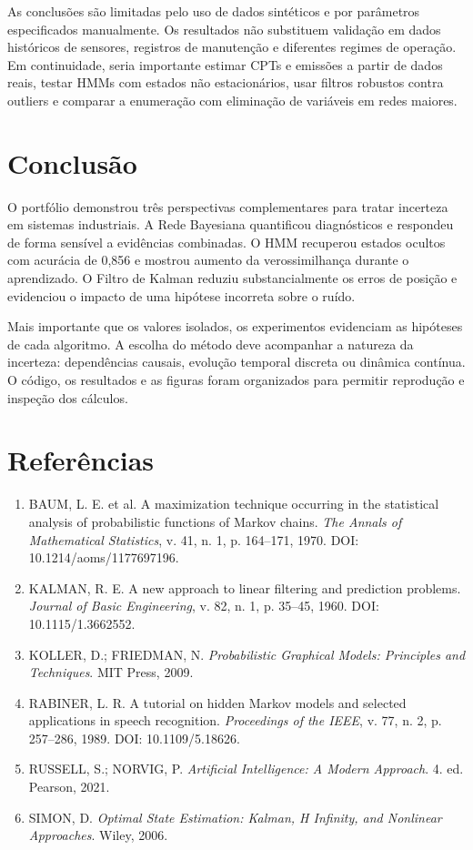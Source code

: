 \documentclass[11pt,a4paper]{article}
\begin{document}
As conclusões são limitadas pelo uso de dados sintéticos e por parâmetros especificados manualmente. Os resultados não substituem validação em dados históricos de sensores, registros de manutenção e diferentes regimes de operação. Em continuidade, seria importante estimar CPTs e emissões a partir de dados reais, testar HMMs com estados não estacionários, usar filtros robustos contra outliers e comparar a enumeração com eliminação de variáveis em redes maiores.

\section{Conclusão}
O portfólio demonstrou três perspectivas complementares para tratar incerteza em sistemas industriais. A Rede Bayesiana quantificou diagnósticos e respondeu de forma sensível a evidências combinadas. O HMM recuperou estados ocultos com acurácia de 0,856 e mostrou aumento da verossimilhança durante o aprendizado. O Filtro de Kalman reduziu substancialmente os erros de posição e evidenciou o impacto de uma hipótese incorreta sobre o ruído.

Mais importante que os valores isolados, os experimentos evidenciam as hipóteses de cada algoritmo. A escolha do método deve acompanhar a natureza da incerteza: dependências causais, evolução temporal discreta ou dinâmica contínua. O código, os resultados e as figuras foram organizados para permitir reprodução e inspeção dos cálculos.

\section*{Referências}
\begin{enumerate}
\item BAUM, L. E. et al. A maximization technique occurring in the statistical analysis of probabilistic functions of Markov chains. \textit{The Annals of Mathematical Statistics}, v. 41, n. 1, p. 164--171, 1970. DOI: 10.1214/aoms/1177697196.
\item KALMAN, R. E. A new approach to linear filtering and prediction problems. \textit{Journal of Basic Engineering}, v. 82, n. 1, p. 35--45, 1960. DOI: 10.1115/1.3662552.
\item KOLLER, D.; FRIEDMAN, N. \textit{Probabilistic Graphical Models: Principles and Techniques}. MIT Press, 2009.
\item RABINER, L. R. A tutorial on hidden Markov models and selected applications in speech recognition. \textit{Proceedings of the IEEE}, v. 77, n. 2, p. 257--286, 1989. DOI: 10.1109/5.18626.
\item RUSSELL, S.; NORVIG, P. \textit{Artificial Intelligence: A Modern Approach}. 4. ed. Pearson, 2021.
\item SIMON, D. \textit{Optimal State Estimation: Kalman, H Infinity, and Nonlinear Approaches}. Wiley, 2006.
\end{enumerate}
\end{document}
